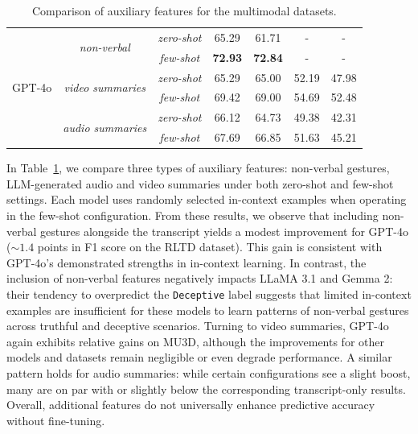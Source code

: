 \begin{table}
\begin{tabular}{l c c cc cc}
\multirow{6}{*}{GPT-4o} 
 & \multirow{2}{*}{\textit{non-verbal}}
   & \textit{zero-shot}
     & 65.29 & 61.71
     & - & -  \\
 & 
   & \textit{\textit{few-shot}}
     & \textbf{72.93} & \textbf{72.84} 
     & - & -  \\
\cmidrule(lr){2-7}
 & \multirow{2}{*}{\textit{video summaries}}
   & \textit{zero-shot}
     & 65.29 & 65.00
     & 52.19 & 47.98 \\
 &
   & \textit{\textit{few-shot}}
     & 69.42 & 69.00 
     & 54.69 & 52.48 \\
\cmidrule(lr){2-7}
 & \multirow{2}{*}{\textit{audio summaries}}
   & \textit{zero-shot}
     & 66.12 & 64.73
     & 49.38 & 42.31 \\
 &
   & \textit{\textit{few-shot}}
     & 67.69 & 66.85
     & 51.63 & 45.21 \\
\bottomrule
\end{tabular}

\caption{Comparison of auxiliary features for the multimodal datasets.}
\label{tab:aux_features_multimodal}
\end{table}


In Table~\ref{tab:aux_features_multimodal}, we compare three types of auxiliary features: non-verbal gestures, LLM-generated audio and video summaries under both zero-shot and few-shot settings. Each model uses randomly selected in-context examples when operating in the few-shot configuration. From these results, we observe that including non-verbal gestures alongside the transcript yields a modest improvement for GPT-4o ($\sim1.4$ points in F1 score on the RLTD dataset). This gain is consistent with GPT-4o’s demonstrated strengths in in-context learning. In contrast, the inclusion of non-verbal features negatively impacts LLaMA 3.1 and Gemma 2: their tendency to overpredict the \texttt{Deceptive} label suggests that limited in-context examples are insufficient for these models to learn patterns of non-verbal gestures across truthful and deceptive scenarios. Turning to video summaries, GPT-4o again exhibits relative gains on MU3D, although the improvements for other models and datasets remain negligible or even degrade performance. A similar pattern holds for audio summaries: while certain configurations see a slight boost, many are on par with or slightly below the corresponding transcript-only results. 
Overall, additional features do not universally enhance predictive accuracy without fine-tuning.


